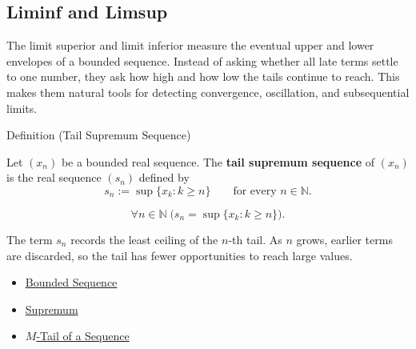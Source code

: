 \subsection*{Liminf and Limsup}
\begin{exposition}
The limit superior and limit inferior measure the eventual upper and lower
envelopes of a bounded sequence. Instead of asking whether all late terms
settle to one number, they ask how high and how low the tails continue to
reach. This makes them natural tools for detecting convergence, oscillation,
and subsequential limits.
\end{exposition}


\begin{definitionbox}{Definition (Tail Supremum Sequence)}
\begin{definition}
\label{def:tail-supremum-sequence}
Let $(x_n)$ be a bounded real sequence. The \textbf{tail supremum
sequence} of $(x_n)$ is the real sequence $(s_n)$ defined by
\[
  s_n:=\sup\{x_k:k\ge n\}
  \qquad\text{for every } n\in\mathbb{N}.
\]
\end{definition}
\end{definitionbox}

\begin{remark*}
\[
\forall n\in\mathbb{N}\;
\bigl(s_n=\sup\{x_k:k\ge n\}\bigr).
\]
\end{remark*}

\begin{remark*}[Interpretation]
The term $s_n$ records the least ceiling of the $n$-th tail. As $n$ grows,
earlier terms are discarded, so the tail has fewer opportunities to reach
large values.
\end{remark*}

\begin{remark*}[Dependencies]\hfill
\begin{itemize}
  \item \hyperref[def:bounded-sequence]{Bounded Sequence}
  \item \hyperref[def:supremum]{Supremum}
  \item \hyperref[def:m-tail]{$M$-Tail of a Sequence}
\end{itemize}
\end{remark*}


